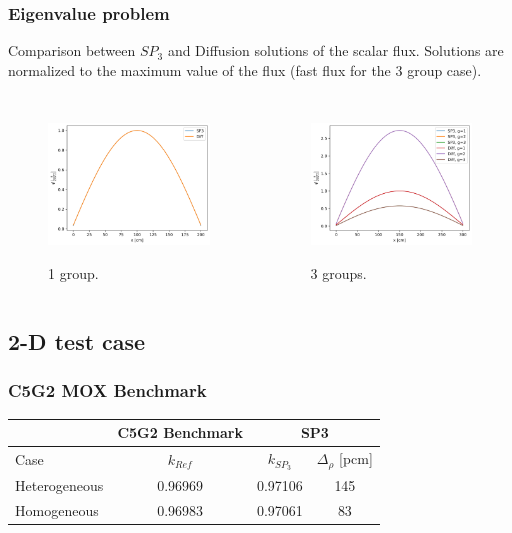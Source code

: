 \begin{frame}
\frametitle{Eigenvalue problem}

Comparison between $SP_3$ and Diffusion solutions of the scalar flux.
Solutions are normalized to the maximum value of the flux (fast flux for the 3 group case).

\begin{columns}
    \column[t]{5cm}
	\begin{figure}[htbp!]
		\begin{center}
			\includegraphics[height=4cm]{figures/output-1g-crit}
		\end{center}
		\caption{1 group.}
	\end{figure}

	\column[t]{5cm}
	\begin{figure}[htbp!]
		\begin{center}
			\includegraphics[height=4cm]{figures/output-3g-crit}
		\end{center}
		\caption{3 groups.}
	\end{figure}
\end{columns}
\end{frame}


\subsection{2-D test case}
\begin{frame}
\frametitle{C5G2 MOX Benchmark}
	\begin{table}[htbp!]
	\centering
	\begin{tabular}{lccc}
	\toprule
	 & C5G2 Benchmark      & \multicolumn{2}{c}{SP3}          \\
	\midrule
	Case & $k_{Ref}$       & $k_{SP_3}$ & $\Delta_\rho$ [pcm] \\
	\midrule
	Heterogeneous & 0.96969  & 0.97106  & 145  \\
	Homogeneous   & 0.96983  & 0.97061  &  83  \\
	\bottomrule
	\end{tabular}
	\label{tab:2d-keff}
	\end{table}
\end{frame}


